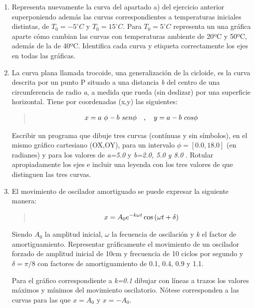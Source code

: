 \documentclass[letterpaper,10pt,spanish]{sphinxmanual}
\begin{document}
\begin{enumerate}
\item {} 
Representa nuevamente la curva del apartado a) del ejercicio anterior superponiendo además las  curvas correspondientes a temperaturas iniciales distintas, de  $T_0=-5^\circ C$ y $T_0=15^\circ C$. Para $T_0=5^\circ C$ representa un una gráfica aparte cómo cambian las curvas con temperaturas ambiente de 20ºC y 50ºC, además de la de 40ºC. Identifica cada curva y etiqueta correctamente los ejes en todas las gráficas.

\item {} 
La curva plana llamada trocoide, una generalización de la cicloide, es la curva descrita por un punto P situado a una distancia \emph{b} del centro de una circunferencia de radio \emph{a}, a medida que rueda (sin deslizar) por una superficie horizontal. Tiene por coordenadas (x,y) las siguientes:
\begin{quote}
\begin{gather}
\begin{split}x = a \ \phi - b \ sen \phi \ \ \ ,\ \ \ y = a - b\ cos \phi\end{split}\notag
\end{gather}\end{quote}

Escribir un programa que dibuje tres curvas (contínuas y sin símbolos), en el mismo gráfico cartesiano (OX,OY), para un intervalo $\phi=[0.0,18.0]$ (en radianes) y para los valores de \emph{a=5.0} y \emph{b=2.0, 5.0 y 8.0} . Rotular apropiadamente los ejes e incluir una leyenda con los tres valores de  que distinguen las tres curvas.

\item {} 
El movimiento de oscilador amortiguado se puede expresar la siguiente manera:
\begin{quote}
\begin{gather}
\begin{split}x = A_0 e^{-k\omega t} \cos{(\omega t + \delta)}\end{split}\notag
\end{gather}\end{quote}

Siendo $A_0$ la amplitud inicial, $\omega$ la fecuencia de oscilación y \emph{k} el factor de amortiguamiento. Representar gráficamente el movimiento de un oscilador forzado de amplitud inicial de 10cm y frecuencia de 10 ciclos por segundo y $\delta=\pi/8$ con factores de amortiguamiento de 0.1, 0.4, 0.9 y 1.1.

Para el gráfico correspondiente a \emph{k=0.1} dibujar con líneas a trazos los valores máximos y mínimos del movimiento oscilatorio. Nótese corresponden a las curvas para las que $x=A_0$ y $x=-A_0$.

\end{enumerate}
\end{document}

